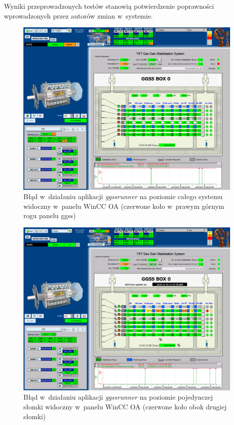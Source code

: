 Wyniki przeprowadzonych testów stanowią potwierdzenie poprawności wprowadzonych przez autorów zmian w~systemie. 

\begin{figure}
\centering
\caption{Błąd w~działaniu aplikacji \textit{ggssrunner} na poziomie całego systemu widoczny w~panelu WinCC OA (czerwone koło w~prawym górnym rogu panelu \gls*{ggss})}
\label{fig:ggssErrorScada}
\includegraphics[width=\textwidth]{res/png/ggssError}
\end{figure}


\begin{figure}
\centering
\caption{Błąd w~działaniu aplikacji \textit{ggssrunner} na poziomie pojedynczej słomki widoczny w~panelu WinCC OA (czerwone koło obok drugiej słomki)}
\label{fig:ggssErrorStrawScada}
\includegraphics[width=\textwidth]{res/png/errStraw}
\end{figure}
